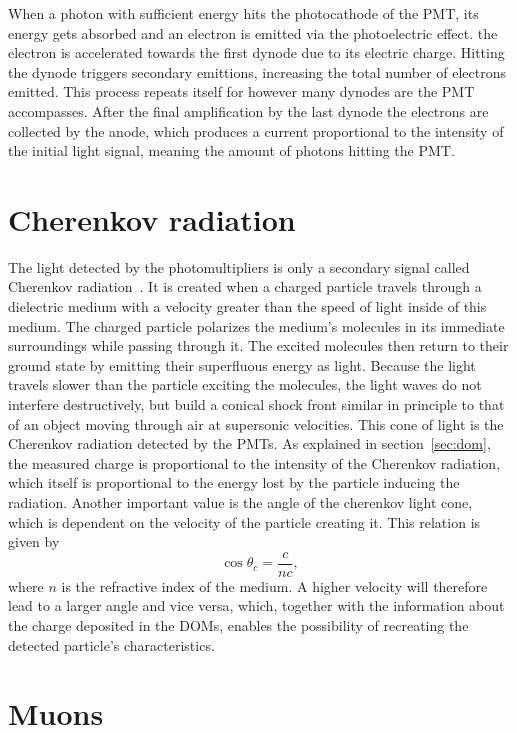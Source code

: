When a photon with sufficient energy hits the photocathode of the PMT, its energy gets absorbed and an electron is emitted via the photoelectric effect.
the electron is accelerated towards the first dynode due to its electric charge. Hitting the dynode triggers secondary emittions, increasing the total 
number of electrons emitted. This process repeats itself for however many dynodes are the PMT accompasses. After the final amplification by the last 
dynode the electrons are collected by the anode, which produces a current proportional to the intensity of the initial light signal, meaning the amount of
photons hitting the PMT\@. 

\section{Cherenkov radiation}

The light detected by the photomultipliers is only a secondary signal called Cherenkov radiation~\cite{einstein}. It is created when a charged particle travels through a 
dielectric medium with a velocity greater than the speed of light inside of this medium. The charged particle polarizes the medium's molecules in its
immediate surroundings while passing through it. The excited molecules then return to their ground state by emitting their superfluous energy as light.
Because the light travels slower than the particle exciting the molecules, the light waves do not interfere destructively, but build a conical shock front 
similar in principle to that of an object moving through air at supersonic velocities. This cone of light is the Cherenkov radiation detected by the PMTs.
As explained in section~\ref{sec:dom}, the measured charge is proportional to the intensity of the Cherenkov radiation, which itself is proportional to the 
energy lost by the particle inducing the radiation. Another important value is the angle of the cherenkov light cone, which is dependent on the velocity of the 
particle creating it. This relation is given by 
\begin{equation}
    \cos{\theta_c} = \frac{c}{nc},
\end{equation}
where $n$ is the refractive index of the medium. A higher velocity will therefore lead to a larger angle and vice versa, which, together with the information about 
the charge deposited in the DOMs, enables the possibility of recreating the detected particle's characteristics.

\section{Muons}\label{sec:muons}

